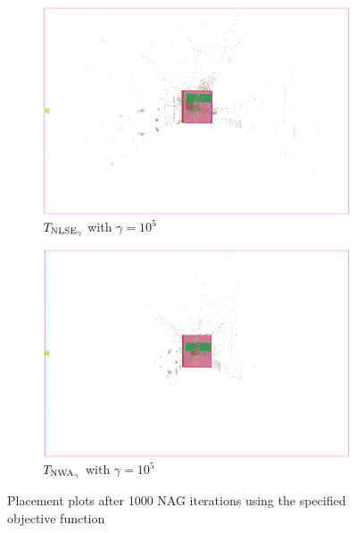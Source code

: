 \begin{figure}[t]
 \begin{subfigure}{.48\textwidth}
  \includegraphics[width=\textwidth]{start_vectors/convergence_Chip1_LSE_center_100000_gamma.png}  
  \caption{\(T_{\operatorname{NLSE}_\gamma}\) with \(\gamma = 10^5\)}
 \end{subfigure}
 \hfill
 \begin{subfigure}{.48\textwidth}
  \includegraphics[width=\textwidth]{start_vectors/convergence_Chip1_WA_center_100000_gamma.png}  
  \caption{\(T_{\operatorname{NWA}_\gamma}\) with \(\gamma = 10^5\)}
 \end{subfigure}
 
 \caption{Placement plots after 1000 NAG iterations using the specified objective function}
 \label{fig:center_placement_plots}
\end{figure}


